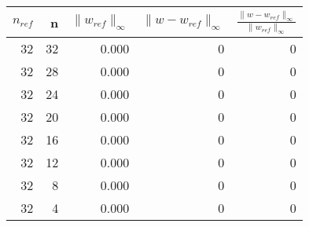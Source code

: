 \begin{tabular}{rrrrr}
\toprule
$n_{ref}$ & n & $\| w_{ref} \|_{\infty}$ & $\| w-w_{ref} \|_{\infty}$ & $\frac{\| w-w_{ref} \|_{\infty}}{\| w_{ref} \|_{\infty}}$ \\
\midrule
32 & 32 & 0.000 & 0 & 0 \\
32 & 28 & 0.000 & 0 & 0 \\
32 & 24 & 0.000 & 0 & 0 \\
32 & 20 & 0.000 & 0 & 0 \\
32 & 16 & 0.000 & 0 & 0 \\
32 & 12 & 0.000 & 0 & 0 \\
32 & 8 & 0.000 & 0 & 0 \\
32 & 4 & 0.000 & 0 & 0 \\
\bottomrule
\end{tabular}
